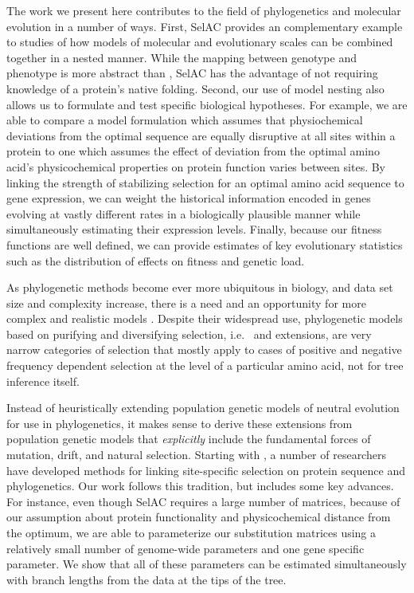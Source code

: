 \documentclass{article}
\newcommand{\selac}{SelAC\xspace}
\begin{document}
The work we present here contributes to the field of phylogenetics and molecular evolution in a number of ways.
First, \selac provides an complementary example to \citet{ThorneEtAl2012} studies of how models of molecular and evolutionary scales can be combined together in a nested manner.
While the mapping between genotype and phenotype is more abstract than \citet{ThorneEtAl2012}, \selac has the advantage of not requiring knowledge of a protein's native folding.
Second, our use of model nesting also allows us to formulate and test specific biological hypotheses.
For example, we are able to compare a model formulation which assumes that physiochemical deviations from the optimal sequence are equally disruptive at all sites within a protein to one which assumes the effect of deviation from the optimal amino acid's physicochemical properties on protein function varies between sites.
By linking the strength of stabilizing selection for an optimal amino acid sequence to gene expression, we can weight the historical information encoded in genes evolving at vastly different rates in a biologically plausible manner while simultaneously estimating their expression levels.
Finally, because our fitness functions are well defined, we can provide estimates of key evolutionary statistics such as the distribution of effects on fitness and genetic load.

As phylogenetic methods become ever more ubiquitous in biology, and data set size and complexity increase, there is a need and an opportunity for more complex and realistic models \citep{GoldmanEtAl1996,ThorneEtAl1996,GoldmanEtAl1998,HalpernAndBruno1998,LartillotAndPhilippe2004}.
Despite their widespread use, phylogenetic models based on purifying and diversifying selection, i.e.~\citet{GoldmanAndYang1994} and extensions, are very narrow categories of selection that mostly apply to cases of positive and negative frequency dependent selection at the level of a particular amino acid, not for tree inference itself.

Instead of heuristically extending population genetic models of neutral evolution for use in phylogenetics, it makes sense to derive these extensions from population genetic models that \emph{explicitly} include the fundamental forces of mutation, drift, and natural selection.
Starting with \citet{HalpernAndBruno1998}, a number of researchers have developed methods for linking site-specific selection on protein sequence and phylogenetics\citep[e.g.~][]{KoshiEtAl1999,DimmicEtAl2000,KoshiAndGoldstein2001,RobinsonEtAl2003,LartillotAndPhilippe2004,ThorneEtAl2012,RodrigueAndLartillot2014}. %
Our work follows this tradition, but includes some key advances.
For instance, even though \selac requires a large number of matrices, because of our assumption about protein functionality and physicochemical distance from the optimum, we are able to parameterize our substitution matrices using a relatively small number of genome-wide parameters and one gene specific parameter.
We show that all of these parameters can be estimated simultaneously with branch lengths from the data at the tips of the tree.
\end{document}
